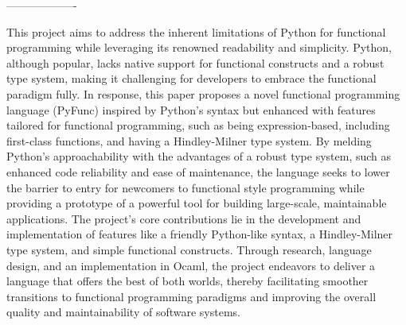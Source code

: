 \documentclass{l4proj}
\begin{document}

\begin{center}
    -------------------
\end{center}




This project aims to address the inherent limitations of Python for functional programming while leveraging its renowned readability and simplicity.
Python, although popular, lacks native support for functional constructs and a robust type system, making it challenging for developers to embrace the functional paradigm fully.
In response, this paper proposes a novel functional programming language (PyFunc) inspired by Python's syntax but enhanced with features tailored for functional programming, such as being expression-based, including first-class functions, and having a Hindley-Milner type system.
By melding Python's approachability with the advantages of a robust type system, such as enhanced code reliability and ease of maintenance, the language seeks to lower the barrier to entry for newcomers to functional style programming while providing a prototype of a powerful tool for building large-scale, maintainable applications.
The project's core contributions lie in the development and implementation of features like a friendly Python-like syntax, a Hindley-Milner type system, and simple functional constructs.
Through research, language design, and an implementation in Ocaml, the project endeavors to deliver a language that offers the best of both worlds, thereby facilitating smoother transitions to functional programming paradigms and improving the overall quality and maintainability of software systems.
\end{document}
